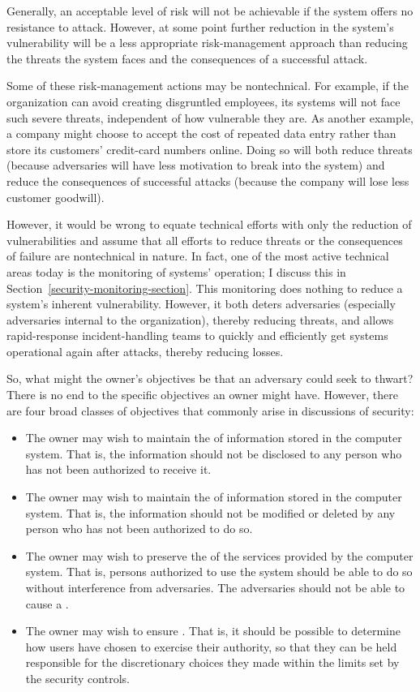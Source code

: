 Generally, an acceptable level of risk will not be achievable if the
system offers no resistance to attack.  However, at some point further
reduction in the system's vulnerability will be a less appropriate
risk-management approach than reducing the threats the system faces
and the consequences of a successful attack.

Some of these risk-management actions may be nontechnical.  For
example, if the organization can avoid creating disgruntled employees,
its systems will not face such severe threats, independent of how
vulnerable they are.  As another example, a company might choose to
accept the cost of repeated data entry rather than store its
customers' credit-card numbers online.  Doing so will both reduce
threats (because adversaries will have less motivation to break into
the system) and reduce the consequences of successful attacks (because
the company will lose less customer goodwill).

However, it would be wrong to equate technical efforts with only the
reduction of vulnerabilities and assume that all efforts to reduce
threats or the consequences of failure are nontechnical in nature.  In
fact, one of the most active technical areas today is the monitoring
of systems' operation; I discuss this in
Section~\ref{security-monitoring-section}.  This monitoring does
nothing to reduce a system's inherent vulnerability.  However, it both
deters adversaries (especially adversaries internal to the
organization), thereby reducing threats, and allows rapid-response
incident-handling teams to quickly and efficiently get systems
operational again after attacks, thereby reducing losses.

So, what might the owner's objectives be that an adversary could seek
to thwart?  There is no end to the specific objectives an owner might
have.  However, there are four broad classes of objectives that
commonly arise in discussions of security:
\begin{itemize}
\item The owner may wish to maintain the  of
  information stored in the computer system.  That is, the information
  should not be disclosed to any person who has not been authorized to
  receive it.
\item The owner may wish to maintain the  of
  information stored in the computer system.  That is, the information
  should not be modified or deleted by any person who has not been
  authorized to do so.
\item The owner may wish to preserve the  of the
  services provided by the computer system.  That is, persons
  authorized to use the system should be able to do so without
  interference from adversaries.  The adversaries
  should not be able to cause a .
\item The owner may wish to ensure .  That is,
  it should be possible to determine how users have chosen to exercise
  their authority, so that they can be held responsible for the
  discretionary choices they made within the limits set by the
  security controls.
\end{itemize}

